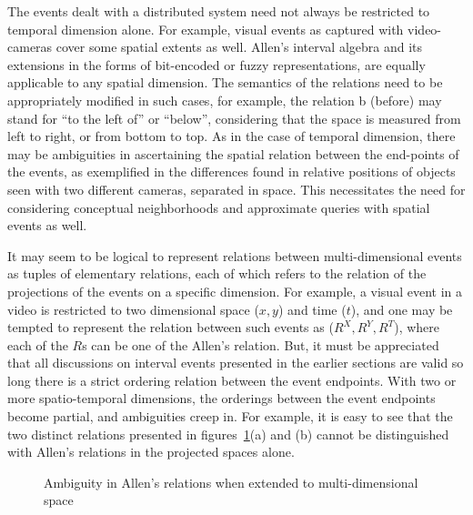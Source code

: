 The events dealt with a distributed system need not always be restricted to temporal dimension alone. For example, visual events
as captured with video-cameras cover some spatial extents as well. Allen's interval algebra and its extensions in the forms of
bit-encoded or fuzzy representations, are equally applicable to any spatial dimension. The semantics of the relations need to be 
appropriately modified in such cases, for example, the relation b (before) may stand for ``to the left of'' or ``below'', considering
that the space is measured from left to right, or from bottom to top. 
%
As in the case of temporal dimension, there may be ambiguities in ascertaining the spatial relation between the end-points of
the events, as exemplified in the differences found in relative positions of objects seen with two different cameras, separated
in space. This necessitates the need for considering conceptual neighborhoods and approximate queries with spatial events as well.

It may seem to be logical to represent relations between multi-dimensional events as tuples of elementary relations, each of which 
refers to the relation of the projections of the events on a specific dimension. For example, a visual event in a video is restricted 
to two dimensional space ($x,y$) and time  ($t$), and one may be tempted to represent the relation between such events as 
($R^X, R^Y, R^T$), where each of the $R$s can be one of the Allen's relation. But, it must  be appreciated that all discussions on 
interval events presented in the earlier sections are valid so long there is a strict ordering relation between the event endpoints. 
With two or more spatio-temporal dimensions, the orderings between the event endpoints become partial, and ambiguities creep in. For 
example, it is easy to see that the two distinct relations presented in figures~\ref{fig:clock:Allen-ambiguity}(a) and (b) cannot 
be distinguished with Allen's relations in the projected spaces alone.


\begin{figure}[htbp!]
	\caption{Ambiguity in Allen's relations when extended to multi-dimensional space}
	\label{fig:clock:Allen-ambiguity}
\end{figure}


